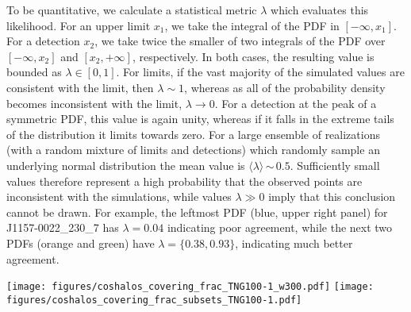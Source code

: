 \documentclass[useAMS,usenatbib]{mnras}
\newcommand{\msun}{\,M$_{\odot}$\xspace}
\newcommand{\ovi}{OVI\xspace}
\begin{document}
To be quantitative, we calculate a statistical metric $\lambda$ which evaluates this likelihood. For an upper limit $x_1$, we take the integral of the PDF in $[-\infty, x_1]$. For a detection $x_2$, we take twice the smaller of two integrals of the PDF over $[-\infty, x_2]$ and $[x_2, +\infty]$, respectively. In both cases, the resulting value is bounded as $\lambda \in [0,1]$. For limits, if the vast majority of the simulated values are consistent with the limit, then $\lambda \sim 1$, whereas as all of the probability density becomes inconsistent with the limit, $\lambda \rightarrow 0$. For a detection at the peak of a symmetric PDF, this value is again unity, whereas if it falls in the extreme tails of the distribution it limits towards zero. For a large ensemble of realizations (with a random mixture of limits and detections) which randomly sample an underlying normal distribution the mean value is $\langle\lambda\rangle$\,$\sim$\,$0.5$. Sufficiently small values therefore represent a high probability that the observed points are inconsistent with the simulations, while values $\lambda \gg 0$ imply that this conclusion cannot be drawn. For example, the leftmost PDF (blue, upper right panel) for J1157-0022\_230\_7 has $\lambda = 0.04$ indicating poor agreement, while the next two PDFs (orange and green) have $\lambda = \{0.38,0.93\}$, indicating much better agreement. 

\begin{figure*}
\centering
\texttt{[image: figures/coshalos\_covering\_frac\_TNG100-1\_w300.pdf]}
\texttt{[image: figures/coshalos\_covering\_frac\_subsets\_TNG100-1.pdf]}
\caption{ Comparison of the covering fractions of \ovi absorption from the COS-Halos survey versus the simulation results from the mock survey-matched galaxy sample. \textbf{(Left panel).} The $\kappa_{\rm OVI}(r)$ profiles for five different column density thresholds spanning $10^{13.5} \rm{cm}^{-2} < N_{\rm OVI}^{\rm min} < 10^{15} \rm{cm}^{-2}$. The green curve corresponds to the value from \protect\cite{werk13}, shown in black points with errorbars, against which it can be directly compared. We find that the covering fraction of \ovi around the mock COS-Halos sample is at least as high as observed. The analogous measurement from the TNG300 simulation is also given for reference as the dotted green line. \textbf{(Right panel).} Comparison of four specific galaxy sub-samples as explored in \protect\cite{werk13} for a sSFR threshold above (or below) $10^{-11}$ yr$^{-1}$ in blue (orange), and a stellar mass threshold above (or below) $10^{10.5}$\msun in red (green). Using either criterion, we find different predicted $\kappa_{\rm OVI}$ profiles for `red' versus `blue' galaxies. The high sSFR sample has high, steeply declining \ovi columns which extend to large distances, while the low sSFR (high $M_\star$) sample exhibits a shallower decline of high \ovi columns and therefore a higher incidence at all projected distances out to 400 kpc. Note: in all cases, colored bands indicate $\pm$0.5$\sigma$ inter-halo variation, which is significant.
 \label{fig_coshalos_cf}}
\end{figure*}
\end{document}
